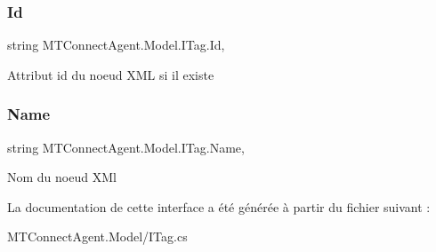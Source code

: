 \subsubsection{\texorpdfstring{Id}{Id}}
{\footnotesize\ttfamily string M\+T\+Connect\+Agent.\+Model.\+I\+Tag.\+Id\hspace{0.3cm}{\ttfamily [get]}, {\ttfamily [set]}}



Attribut id du noeud X\+ML si il existe 

\mbox{\label{interface_m_t_connect_agent_1_1_model_1_1_i_tag_abb69a3ec05f4a38736a69571c13eb6e8}} 
\subsubsection{\texorpdfstring{Name}{Name}}
{\footnotesize\ttfamily string M\+T\+Connect\+Agent.\+Model.\+I\+Tag.\+Name\hspace{0.3cm}{\ttfamily [get]}, {\ttfamily [set]}}



Nom du noeud X\+Ml 



La documentation de cette interface a été générée à partir du fichier suivant \+:\begin{DoxyCompactItemize}
\item 
M\+T\+Connect\+Agent.\+Model/I\+Tag.\+cs\end{DoxyCompactItemize}

